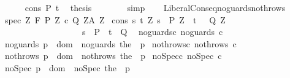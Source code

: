 \begin{isabellebody}
\ \ \ \ \isamarkupfalse%
\ cons\ P\ t\ \isamarkupfalse%
\ {\isacharquery}thesis\isanewline
\ \ \ \ \ \ \isamarkupfalse%
\ simp\isanewline
\ \ \isamarkupfalse%
\isanewline
{}\isamarkupfalse%
%
\endisatagproof
{\isafoldproof}%
%
\isadelimproof
\isanewline
%
\endisadelimproof
\isanewline
\isanewline
{}\isamarkupfalse%
\ LiberalConseq{\isacharunderscore}noguards{\isacharunderscore}nothrows{\isacharcolon}\isanewline
{}\ spec{\isacharcolon}\ {\isachardoublequoteopen}{\isasymforall}Z{\isachardot}\ {\isasymGamma}{\isacharcomma}{\isasymTheta}{\isasymturnstile}\isactrlbsub {\isacharslash}F\isactrlesub \ {\isacharparenleft}P{\isacharprime}\ Z{\isacharparenright}\ c\ {\isacharparenleft}Q{\isacharprime}\ Z{\isacharparenright}{\isacharcomma}{\isacharparenleft}A{\isacharprime}\ Z{\isacharparenright}{\isachardoublequoteclose}\isanewline
{}\ cons{\isacharcolon}\ {\isachardoublequoteopen}{\isasymforall}s\ t{\isachardot}\ {\isacharparenleft}{\isasymforall}Z{\isachardot}\ s\ {\isasymin}\ P{\isacharprime}\ Z\ {\isasymlongrightarrow}\ t\ {\isasymin}\ \ Q{\isacharprime}\ Z\ {\isacharparenright}\isanewline
\ \ \ \ \ \ \ \ \ \ \ \ \ \ \ \ \ \ {\isasymlongrightarrow}\ {\isacharparenleft}s\ {\isasymin}\ P\ {\isasymlongrightarrow}\ t\ {\isasymin}\ Q\ {\isacharparenright}{\isachardoublequoteclose}\isanewline
{}\ noguards{\isacharunderscore}c{\isacharcolon}\ {\isachardoublequoteopen}noguards\ c{\isachardoublequoteclose}\isanewline
{}\ noguards{\isacharunderscore}{\isasymGamma}{\isacharcolon}\ {\isachardoublequoteopen}{\isasymforall}p\ {\isasymin}\ dom\ {\isasymGamma}{\isachardot}\ noguards\ {\isacharparenleft}the\ {\isacharparenleft}{\isasymGamma}\ p{\isacharparenright}{\isacharparenright}{\isachardoublequoteclose}\isanewline
{}\ nothrows{\isacharunderscore}c{\isacharcolon}\ {\isachardoublequoteopen}nothrows\ c{\isachardoublequoteclose}\isanewline
{}\ nothrows{\isacharunderscore}{\isasymGamma}{\isacharcolon}\ {\isachardoublequoteopen}{\isasymforall}p\ {\isasymin}\ dom\ {\isasymGamma}{\isachardot}\ nothrows\ {\isacharparenleft}the\ {\isacharparenleft}{\isasymGamma}\ p{\isacharparenright}{\isacharparenright}{\isachardoublequoteclose}\isanewline
{}\ noSpec{\isacharunderscore}c{\isacharcolon}\ {\isachardoublequoteopen}noSpec\ c{\isachardoublequoteclose}\isanewline
{}\ noSpec{\isacharunderscore}{\isasymGamma}{\isacharcolon}\ {\isachardoublequoteopen}{\isasymforall}p\ {\isasymin}\ dom\ {\isasymGamma}{\isachardot}\ noSpec\ {\isacharparenleft}the\ {\isacharparenleft}{\isasymGamma}\ p{\isacharparenright}{\isacharparenright}{\isachardoublequoteclose}\isanewline

\end{isabellebody}
